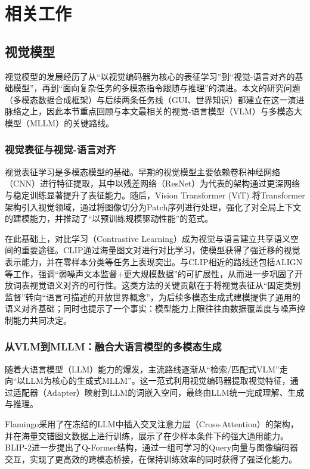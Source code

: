 \chapter{相关工作}

\section{视觉模型}
视觉模型的发展经历了从“以视觉编码器为核心的表征学习”到“视觉-语言对齐的基础模型”，再到“面向复杂任务的多模态指令跟随与推理”的演进。本文的研究问题（多模态数据合成框架）与后续两条任务线（GUI、世界知识）都建立在这一演进脉络之上，因此本节重点回顾与本文最相关的视觉-语言模型（VLM）与多模态大模型（MLLM）的关键路线。

\subsection{视觉表征与视觉-语言对齐}
视觉表征学习是多模态模型的基础。早期的视觉模型主要依赖卷积神经网络（CNN）进行特征提取，其中以残差网络（ResNet）为代表的架构通过更深网络与稳定训练显著提升了表征能力\citep{he2016resnet}。随后，Vision Transformer (ViT) 将Transformer架构引入视觉领域，通过将图像切分为Patch序列进行处理，强化了对全局上下文的建模能力，并推动了“以预训练规模驱动性能”的范式\citep{dosovitskiy2021vit}。

在此基础上，对比学习（Contrastive Learning）成为视觉与语言建立共享语义空间的重要途径。CLIP通过海量图文对进行对比学习，使模型获得了强迁移的视觉表示能力，并在零样本分类等任务上表现突出\citep{radford2021learning}。与CLIP相近的路线还包括ALIGN等工作，强调“弱噪声文本监督+更大规模数据”的可扩展性，从而进一步巩固了开放词表视觉语义对齐的可行性\citep{jia2021align}。这类方法的关键贡献在于将视觉表征从“固定类别监督”转向“语言可描述的开放世界概念”，为后续多模态生成式建模提供了通用的语义对齐基础；同时也提示了一个事实：模型能力上限往往由数据覆盖度与噪声控制能力共同决定。

\subsection{从VLM到MLLM：融合大语言模型的多模态生成}
随着大语言模型（LLM）能力的爆发，主流路线逐渐从“检索/匹配式VLM”走向“以LLM为核心的生成式MLLM”。这一范式利用视觉编码器提取视觉特征，通过适配器（Adapter）映射到LLM的词嵌入空间，最终由LLM统一完成理解、生成与推理。

Flamingo采用了在冻结的LLM中插入交叉注意力层（Cross-Attention）的架构，并在海量交错图文数据上进行训练，展示了在少样本条件下的强大通用能力\citep{alayrac2022flamingo}。BLIP-2进一步提出了Q-Former结构，通过一组可学习的Query向量与图像编码器交互，实现了更高效的跨模态桥接，在保持训练效率的同时获得了强泛化能力\citep{li2023blip2}。


